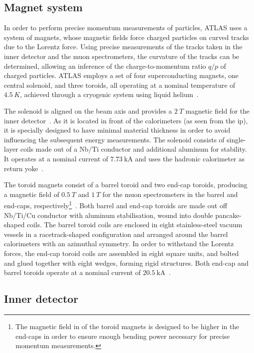 \subsection{Magnet system}

In order to perform precise momentum measurements of particles, ATLAS uses a system of magnets, whose magnetic fields force charged particles on curved tracks due to the Lorentz force. Using precise measurements of the tracks taken in the inner detector and the muon spectrometers, the curvature of the tracks can be determined, allowing an inference of the charge-to-momentum ratio $q/p$ of charged particles. ATLAS employs a set of four superconducting magnets, one central solenoid, and three toroids, all operating at a nominal temperature of $\SI{4.5}{K}$, achieved through a cryogenic system using liquid helium~\cite{Aad:2008zzm}. 

The solenoid is aligned on the beam axis and provides a $\SI{2}{T}$ magnetic field for the inner detector~\cite{Aad:2008zzm}. As it is located in front of the calorimeters (as seen from the \gls{ip}), it is specially designed to have minimal material thickness in order to avoid influencing the subsequent energy measurements. The solenoid consists of single-layer coils made out of a Nb/Ti conductor and additional aluminum for stability. It operates at a nominal current of $\SI{7.73}{\kilo\ampere}$ and uses the hadronic calorimeter as return yoke~\cite{Aad:2008zzm}.

The toroid magnets consist of a barrel toroid and two end-cap toroids, producing a magnetic field of $\SI{0.5}{T}$ and $\SI{1}{T}$ for the muon spectrometers in the barrel and end-caps, respectively\footnote{The magnetic field in of the toroid magnets is designed to be higher in the end-caps in order to ensure enough bending power necessary for precise momentum measurements.}~\cite{Aad:2008zzm}. Both barrel and end-cap toroids are made out off Nb/Ti/Cu conductor with aluminum stabilisation, wound into double pancake-shaped coils. The barrel toroid coils are enclosed in eight stainless-steel vacuum vessels in a racetrack-shaped configuration and arranged around the barrel calorimeters with an azimuthal symmetry. In order to withstand the Lorentz forces, the end-cap toroid coils are assembled in eight square units, and bolted and glued together with eight wedges, forming rigid structures. Both end-cap and barrel toroids operate at a nominal current of $\SI{20.5}{\kilo\ampere}$~\cite{Aad:2008zzm}.

\subsection{Inner detector}

